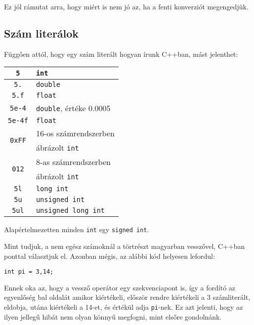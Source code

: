 \documentclass[a4paper,11.5pt,table]{article}
\begin{document}
	Ez jól rámutat arra, hogy miért is nem jó az, ha a fenti konverziót megengedjük.
	\subsection{Szám literálok}
	Függően attól, hogy egy szám literált hogyan írunk C++ban, mást jelenthet:
	\begin{center}
		\setlength{\extrarowheight}{2pt}
		\begin{tabular}{|c|l|}
			\hline
			\texttt{5}						&\texttt{int}\\
			\hline
			\texttt{5.}						&\texttt{double}\\
			\hline
			\texttt{5.f}					&\texttt{float}\\
			\hline
			\texttt{5e-4}					&\texttt{double}, értéke 0.0005\\
			\hline
			\texttt{5e-4f}					&\texttt{float}\\
			\hline
			\multirow{2}{*}{\texttt{0xFF}}	&{16-os számrendszerben}\\
											& ábrázolt \texttt{int}\\
			\hline
			\multirow{2}{*}{\texttt{012}}	&{8-as számrendszerben}\\
											&ábrázolt \texttt{int}\\
			\hline
			\texttt{5l}						&\texttt{long int}\\
			\hline
			\texttt{5u}						&\texttt{unsigned int}\\
			\hline
			\texttt{5ul}					&\texttt{unsigned long int}\\
			\hline
		\end{tabular}
		\end{center}
	\begin{note}
		Alapértelmezetten minden \texttt{int} egy \texttt{signed int}.
	\end{note}
	Mint tudjuk, a nem egész számoknál a törtrészt magyarban vesszővel, C++ban ponttal választjuk el. Azonban mégis, az alábbi kód helyesen lefordul:
	\begin{lstlisting}
int pi = 3,14;
	\end{lstlisting}
	Ennek oka az, hogy a vessző operátor egy szekvenciapont is, így a fordító az egyenlőség bal oldalát amikor kiértékeli, először rendre kiértékeli a 3 számliterált, eldobja, utána kiértékeli a 14-et, és értékül adja \texttt{pi}-nek. Ez azt jelenti, hogy az ilyen jellegű hibát nem olyan könnyű megfogni, mint elsőre gondolnánk.
	
\end{document}
